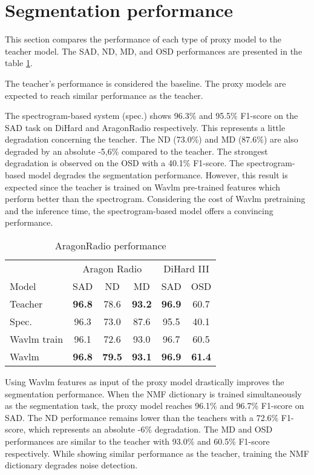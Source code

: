 \section{Segmentation performance}
\label{sect:perf}

This section compares the performance of each type of proxy model to the teacher model.
The SAD, ND, MD, and OSD performances are presented in the table \ref*{tab:seg_results}.

The teacher's performance is considered the baseline.
The proxy models are expected to reach similar performance as the teacher.

The spectrogram-based system (spec.) shows 96.3\% and 95.5\% F1-score on the SAD task on DiHard and AragonRadio respectively.
This represents a little degradation concerning the teacher.
The ND (73.0\%) and MD (87.6\%) are also degraded by an absolute -5,6\% compared to the teacher.
The strongest degradation is observed on the OSD with a 40.1\% F1-score.
The spectrogram-based model degrades the segmentation performance.
However, this result is expected since the teacher is trained on Wavlm pre-trained features which perform better than the spectrogram.
Considering the cost of Wavlm pretraining and the inference time, the spectrogram-based model offers a convincing performance.

\begin{table}[ht]
    \centering
    \begin{tabular}{lccccc}
        \toprule
         & \multicolumn{3}{c}{Aragon Radio} & \multicolumn{2}{c}{DiHard III} \\
         \cmidrule{2-4}
         \cmidrule{5-6}
         Model & SAD & ND & MD & SAD & OSD \\  
         \midrule
         Teacher & \textbf{96.8} & 78.6 & \textbf{93.2} & \textbf{96.9} & 60.7\\
         \midrule
         Spec. & 96.3 & 73.0 &  87.6 & 95.5 & 40.1\\
         Wavlm train & 96.1 & 72.6 & 93.0 & 96.7 & 60.5\\
         Wavlm & \textbf{96.8} & \textbf{79.5} & \textbf{93.1} & \textbf{96.9} & \textbf{61.4} \\
         \bottomrule
    \end{tabular}
    \caption{AragonRadio performance}
    \label{tab:seg_results}
\end{table}

Using Wavlm features as input of the proxy model drastically improves the segmentation performance.
When the NMF dictionary is trained simultaneously as the segmentation task, the proxy model reaches 96.1\% and 96.7\% F1-score on SAD.
The ND performance remains lower than the teachers with a 72.6\% F1-score, which represents an absolute -6\% degradation.
The MD and OSD performances are similar to the teacher with 93.0\% and 60.5\% F1-score respectively.
While showing similar performance as the teacher, training the NMF dictionary degrades noise detection.

